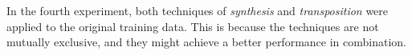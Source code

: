 
In the fourth experiment, both techniques of
\emph{synthesis} and \emph{transposition} were applied to
the original training data. This is because the techniques
are not mutually exclusive, and they might achieve a better
performance in combination.

